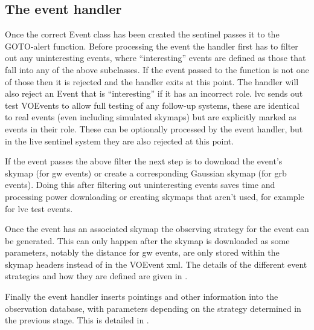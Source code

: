 \begin{colsection}
\begin{colsection}
\end{colsection}


\subsection{The event handler}
\label{sec:event_handler}
\begin{colsection}

Once the correct Event class has been created the sentinel passes it to the GOTO-alert  function. Before processing the event the handler first has to filter out any uninteresting events, where ``interesting'' events are defined as those that fall into any of the above subclasses. If the event passed to the function is not one of those then it is rejected and the handler exits at this point. The handler will also reject an Event that is ``interesting'' if it has an incorrect role. \gls{lvc} sends out test VOEvents to allow full testing of any follow-up systems, these are identical to real events (even including simulated skymaps) but are explicitly marked as  events in their role. These can be optionally processed by the event handler, but in the live sentinel system they are also rejected at this point.

If the event passes the above filter the next step is to download the event's skymap (for \gls{gw} events) or create a corresponding Gaussian skymap (for \gls{grb} events). Doing this after filtering out uninteresting events saves time and processing power downloading or creating skymaps that aren't used, for example for \gls{lvc} test events.

Once the event has an associated skymap the observing strategy for the event can be generated. This can only happen after the skymap is downloaded as some parameters, notably the distance for \gls{gw} events, are only stored within the skymap headers instead of in the VOEvent \gls{xml}. The details of the different event strategies and how they are defined are given in .

Finally the event handler inserts pointings and other information into the observation database, with parameters depending on the strategy determined in the previous stage. This is detailed in .

\end{colsection}



\end{colsection}
